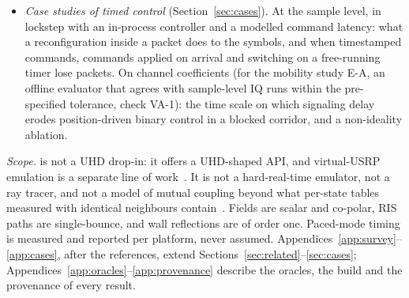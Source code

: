 \begin{itemize}
  sample rates and feature sets, including the native ZMQ data plane, on AWS Linux servers;
  and, for a controller served over the control socket, command latency and timed-command
  exactness, though page deadlines fail our Sustainable rule.
\item \emph{Case studies of timed control} (Section~\ref{sec:cases}).
  At the sample level, in lockstep with an in-process controller and a
  modelled command latency: what a reconfiguration inside a packet does to the symbols, and
  when timestamped commands, commands applied on arrival and switching on a free-running
  timer lose packets. On channel coefficients (for the mobility study E-A, an offline evaluator that agrees with
  sample-level IQ runs within the pre-specified tolerance, check VA-1): the time scale on
  which signaling delay erodes position-driven binary control in a blocked corridor, and a
  non-ideality ablation.
\end{itemize}

\emph{Scope.} \sremu{} is not a UHD drop-in: it offers a UHD-shaped API, and
virtual-USRP emulation is a separate line of work~\cite{Gurses2026ACHEM}. It is not a
hard-real-time emulator, not a ray tracer, and not a model of mutual coupling beyond what
per-state tables measured with identical neighbours contain~\cite{ETSI_GR_RIS003_v121}.
Fields are scalar and co-polar, RIS paths are single-bounce, and wall reflections are of
order one. Paced-mode timing is measured and reported per platform, never assumed.
Appendices~\ref{app:survey}--\ref{app:cases}, after the references, extend
Sections~\ref{sec:related}--\ref{sec:cases}; Appendices~\ref{app:oracles}--\ref{app:provenance}
describe the oracles, the build and the provenance of every result.
